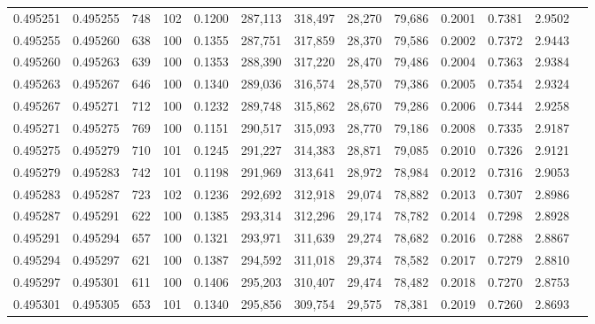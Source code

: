 \begin{tabular}{rrrrrrrrrrrrr}
0.495251 & 0.495255 &   748 & 102 &                                     0.1200 & 287,113 & 318,497 &  28,270 &  79,686 & 0.2001 & 0.7381 & 2.9502 \\
0.495255 & 0.495260 &   638 & 100 &                                     0.1355 & 287,751 & 317,859 &  28,370 &  79,586 & 0.2002 & 0.7372 & 2.9443 \\
0.495260 & 0.495263 &   639 & 100 &                                     0.1353 & 288,390 & 317,220 &  28,470 &  79,486 & 0.2004 & 0.7363 & 2.9384 \\
0.495263 & 0.495267 &   646 & 100 &                                     0.1340 & 289,036 & 316,574 &  28,570 &  79,386 & 0.2005 & 0.7354 & 2.9324 \\
0.495267 & 0.495271 &   712 & 100 &                                     0.1232 & 289,748 & 315,862 &  28,670 &  79,286 & 0.2006 & 0.7344 & 2.9258 \\
0.495271 & 0.495275 &   769 & 100 &                                     0.1151 & 290,517 & 315,093 &  28,770 &  79,186 & 0.2008 & 0.7335 & 2.9187 \\
0.495275 & 0.495279 &   710 & 101 &                                     0.1245 & 291,227 & 314,383 &  28,871 &  79,085 & 0.2010 & 0.7326 & 2.9121 \\
0.495279 & 0.495283 &   742 & 101 &                                     0.1198 & 291,969 & 313,641 &  28,972 &  78,984 & 0.2012 & 0.7316 & 2.9053 \\
0.495283 & 0.495287 &   723 & 102 &                                     0.1236 & 292,692 & 312,918 &  29,074 &  78,882 & 0.2013 & 0.7307 & 2.8986 \\
0.495287 & 0.495291 &   622 & 100 &                                     0.1385 & 293,314 & 312,296 &  29,174 &  78,782 & 0.2014 & 0.7298 & 2.8928 \\
0.495291 & 0.495294 &   657 & 100 &                                     0.1321 & 293,971 & 311,639 &  29,274 &  78,682 & 0.2016 & 0.7288 & 2.8867 \\
0.495294 & 0.495297 &   621 & 100 &                                     0.1387 & 294,592 & 311,018 &  29,374 &  78,582 & 0.2017 & 0.7279 & 2.8810 \\
0.495297 & 0.495301 &   611 & 100 &                                     0.1406 & 295,203 & 310,407 &  29,474 &  78,482 & 0.2018 & 0.7270 & 2.8753 \\
0.495301 & 0.495305 &   653 & 101 &                                     0.1340 & 295,856 & 309,754 &  29,575 &  78,381 & 0.2019 & 0.7260 & 2.8693 \\

\end{tabular}
